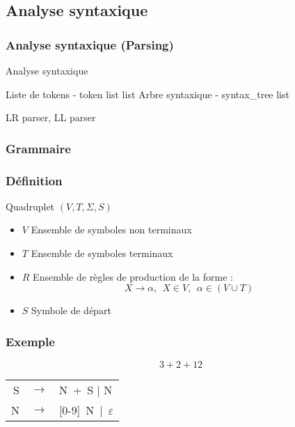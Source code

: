 \documentclass{beamer}
\newcommand{\ra}{\longrightarrow}
\begin{document}
\subsection{Analyse syntaxique}
\begin{frame}
   \frametitle{Analyse syntaxique (Parsing)}
   \begin{algorithm}[H]
      \caption{Analyse syntaxique}
      \begin{algorithmic}
         \Require Liste de tokens - token list list
         \Ensure Arbre syntaxique - syntax\_tree list
      \end{algorithmic}
   \end{algorithm}
   \bigbreak
   LR parser, LL parser
\end{frame}

\subsubsection{Grammaire}
\begin{frame}
   \frametitle{Définition}
   Quadruplet $(V, T, \Sigma, S)$
   \begin{itemize}
      \item $V$ Ensemble de symboles non terminaux
      \item $T$ Ensemble de symboles terminaux
      \item $R$ Ensemble de règles de production de la forme :
                $$X \ra \alpha , ~~ X \in V , ~~ \alpha \in (V \cup T)$$
      \item $S$ Symbole de départ
   \end{itemize}
\end{frame}

\begin{frame}
   \frametitle{Exemple}
   $$3 + 2 + 12$$
   \begin{minipage}{.45\textwidth}
      \begin{tabular}{rcl}
         S & $\longrightarrow$ & N~+~S | N\\
         N & $\longrightarrow$ & [$0$-$9$]~N~|~$\varepsilon$\\
      \end{tabular}
   \end{minipage}
   \hspace{.05\textwidth}
   \begin{minipage}{.45\textwidth}
   \end{minipage}
\end{frame}
\end{document}
